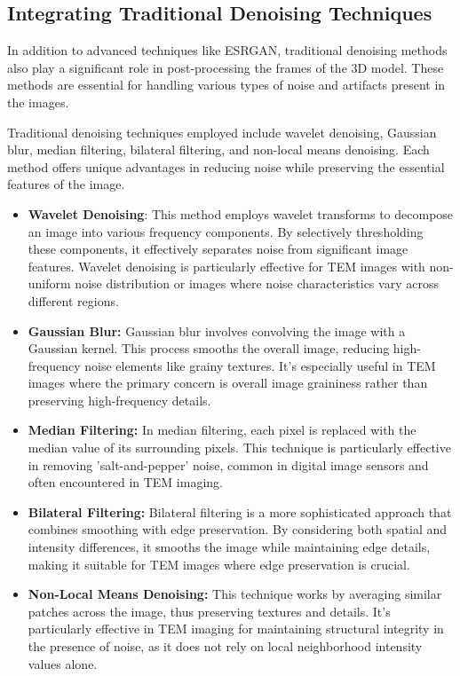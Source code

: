 \vspace{10pt}
\subsection{Integrating Traditional Denoising Techniques}
In addition to advanced techniques like ESRGAN, traditional denoising methods also play a significant role in post-processing the frames of the 3D model. These methods are essential for handling various types of noise and artifacts present in the images.
\vspace{10pt}

Traditional denoising techniques employed include wavelet denoising, Gaussian blur, median filtering, bilateral filtering, and non-local means denoising. Each method offers unique advantages in reducing noise while preserving the essential features of the image.

\begin{itemize}
    \item \textbf{Wavelet Denoising}: This method employs wavelet transforms to decompose an image into various frequency components. By selectively thresholding these components, it effectively separates noise from significant image features. Wavelet denoising is particularly effective for TEM images with non-uniform noise distribution or images where noise characteristics vary across different regions.
    
    \item \textbf{Gaussian Blur:} Gaussian blur involves convolving the image with a Gaussian kernel. This process smooths the overall image, reducing high-frequency noise elements like grainy textures. It's especially useful in TEM images where the primary concern is overall image graininess rather than preserving high-frequency details.

    \item \textbf{Median Filtering:} In median filtering, each pixel is replaced with the median value of its surrounding pixels. This technique is particularly effective in removing 'salt-and-pepper' noise, common in digital image sensors and often encountered in TEM imaging.
    
    \item \textbf{Bilateral Filtering:} Bilateral filtering is a more sophisticated approach that combines smoothing with edge preservation. By considering both spatial and intensity differences, it smooths the image while maintaining edge details, making it suitable for TEM images where edge preservation is crucial.
    
    \item \textbf{Non-Local Means Denoising:} This technique works by averaging similar patches across the image, thus preserving textures and details. It's particularly effective in TEM imaging for maintaining structural integrity in the presence of noise, as it does not rely on local neighborhood intensity values alone.
    
\end{itemize}

